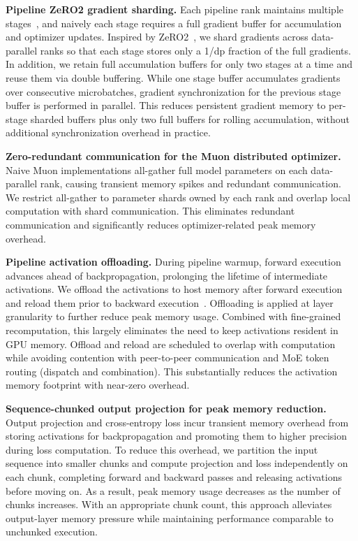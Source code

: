 \textbf{Pipeline ZeRO2 gradient sharding.} Each pipeline rank maintains multiple stages~\cite{narayanan2021efficientlargescalelanguagemodel}, and naively each stage requires a full gradient buffer for accumulation and optimizer updates. Inspired by ZeRO2~\cite{rajbhandari2020zeromemoryoptimizationstraining}, we shard gradients across data-parallel ranks so that each stage stores only a 1/dp fraction of the full gradients. In addition, we retain full accumulation buffers for only two stages at a time and reuse them via double buffering. While one stage buffer accumulates gradients over consecutive microbatches, gradient synchronization for the previous stage buffer is performed in parallel. This reduces persistent gradient memory to per-stage sharded buffers plus only two full buffers for rolling accumulation, without additional synchronization overhead in practice.

\textbf{Zero-redundant communication for the Muon distributed optimizer.} Naive Muon implementations all-gather full model parameters on each data-parallel rank, causing transient memory spikes and redundant communication. We restrict all-gather to parameter shards owned by each rank and overlap local computation with shard communication. This eliminates redundant communication and significantly reduces optimizer-related peak memory overhead.

\textbf{Pipeline activation offloading.} During pipeline warmup, forward execution advances ahead of backpropagation, prolonging the lifetime of intermediate activations. We offload the activations to host memory after forward execution and reload them prior to backward execution~\cite{298555}. Offloading is applied at layer granularity to further reduce peak memory usage. Combined with fine-grained recomputation, this largely eliminates the need to keep activations resident in GPU memory. Offload and reload are scheduled to overlap with computation while avoiding contention with peer-to-peer communication and MoE token routing (dispatch and combination). This substantially reduces the activation memory footprint with near-zero overhead.

\textbf{Sequence-chunked output projection for peak memory reduction.} 
Output projection and cross-entropy loss incur transient memory overhead from storing activations for backpropagation and promoting them to higher precision during loss computation. To reduce this overhead, we partition the input sequence into smaller chunks and compute projection and loss independently on each chunk, completing forward and backward passes and releasing activations before moving on. As a result, peak memory usage decreases as the number of chunks increases. With an appropriate chunk count, this approach alleviates output-layer memory pressure while maintaining performance comparable to unchunked execution.


